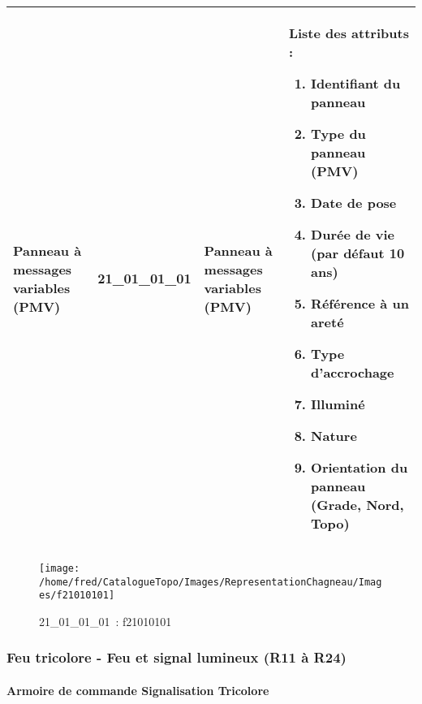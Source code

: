 \documentclass[12pt,titlepage]{book}
\begin{document}
\renewcommand{\arraystretch}{1.2}
\begin{supertabular}{|p{10cm}|c|p{13cm}|p{12cm}|}
 Panneau à messages variables (PMV) & 21\_01\_01\_01 & Panneau à messages variables (PMV) & Liste des attributs :
\begin{enumerate}
  \item Identifiant du panneau  \item Type du panneau (PMV)  \item Date de pose  \item Durée de vie (par défaut 10 ans)  \item Référence à un areté  \item Type d'accrochage  \item Illuminé  \item Nature  \item Orientation du panneau (Grade, Nord, Topo)\end{enumerate}
\\
\hline
\end{supertabular}
\begin{figure}[h!]
  \hfill         %
  \begin{minipage}[t]{3cm}
    \begin{center}
      \texttt{[image: /home/fred/CatalogueTopo/Images/RepresentationChagneau/Images/f21010101]}
      \caption[~21\_01\_01\_01]{\small{21\_01\_01\_01~:} \tiny{f21010101}}\label{f21010101}
    \end{center}
  \end{minipage}
\end{figure}

\subsubsection{\large Feu tricolore - Feu et signal lumineux (R11 à R24)}
\paragraph{Armoire de commande Signalisation Tricolore}
\noindent
\vspace{\baselineskip}
\end{document}
